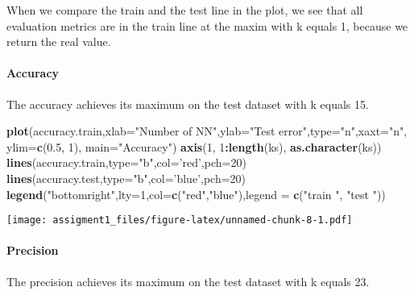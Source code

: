 \documentclass[
]{article}
\newenvironment{Shaded}{\begin{snugshade}}{\end{snugshade}}
\newcommand{\DataTypeTok}[1]{\textcolor[rgb]{0.13,0.29,0.53}{#1}}
\newcommand{\DecValTok}[1]{\textcolor[rgb]{0.00,0.00,0.81}{#1}}
\newcommand{\FloatTok}[1]{\textcolor[rgb]{0.00,0.00,0.81}{#1}}
\newcommand{\KeywordTok}[1]{\textcolor[rgb]{0.13,0.29,0.53}{\textbf{#1}}}
\newcommand{\NormalTok}[1]{#1}
\newcommand{\OperatorTok}[1]{\textcolor[rgb]{0.81,0.36,0.00}{\textbf{#1}}}
\newcommand{\StringTok}[1]{\textcolor[rgb]{0.31,0.60,0.02}{#1}}
\begin{document}
When we compare the train and the test line in the plot, we see that all
evaluation metrics are in the train line at the maxim with k equals 1,
because we return the real value.

\hypertarget{accuracy}{%
\paragraph{Accuracy}\label{accuracy}}

The accuracy achieves its maximum on the test dataset with k equals 15.

\begin{Shaded}
\begin{Highlighting}[]
\KeywordTok{plot}\NormalTok{(accuracy.train,}\DataTypeTok{xlab=}\StringTok{"Number of NN"}\NormalTok{,}\DataTypeTok{ylab=}\StringTok{"Test error"}\NormalTok{,}\DataTypeTok{type=}\StringTok{"n"}\NormalTok{,}\DataTypeTok{xaxt=}\StringTok{"n"}\NormalTok{, }\DataTypeTok{ylim=}\KeywordTok{c}\NormalTok{(}\FloatTok{0.5}\NormalTok{, }\DecValTok{1}\NormalTok{),  }\DataTypeTok{main=}\StringTok{"Accuracy"}\NormalTok{)}
\KeywordTok{axis}\NormalTok{(}\DecValTok{1}\NormalTok{, }\DecValTok{1}\OperatorTok{:}\KeywordTok{length}\NormalTok{(ks), }\KeywordTok{as.character}\NormalTok{(ks))}
\KeywordTok{lines}\NormalTok{(accuracy.train,}\DataTypeTok{type=}\StringTok{"b"}\NormalTok{,}\DataTypeTok{col=}\StringTok{'red'}\NormalTok{,}\DataTypeTok{pch=}\DecValTok{20}\NormalTok{)}
\KeywordTok{lines}\NormalTok{(accuracy.test,}\DataTypeTok{type=}\StringTok{"b"}\NormalTok{,}\DataTypeTok{col=}\StringTok{'blue'}\NormalTok{,}\DataTypeTok{pch=}\DecValTok{20}\NormalTok{)}
\KeywordTok{legend}\NormalTok{(}\StringTok{"bottomright"}\NormalTok{,}\DataTypeTok{lty=}\DecValTok{1}\NormalTok{,}\DataTypeTok{col=}\KeywordTok{c}\NormalTok{(}\StringTok{"red"}\NormalTok{,}\StringTok{"blue"}\NormalTok{),}\DataTypeTok{legend =} \KeywordTok{c}\NormalTok{(}\StringTok{"train "}\NormalTok{, }\StringTok{"test "}\NormalTok{))}
\end{Highlighting}
\end{Shaded}

\texttt{[image: assigment1\_files/figure-latex/unnamed-chunk-8-1.pdf]}

\hypertarget{precision}{%
\paragraph{Precision}\label{precision}}

The precision achieves its maximum on the test dataset with k equals 23.
\end{document}
